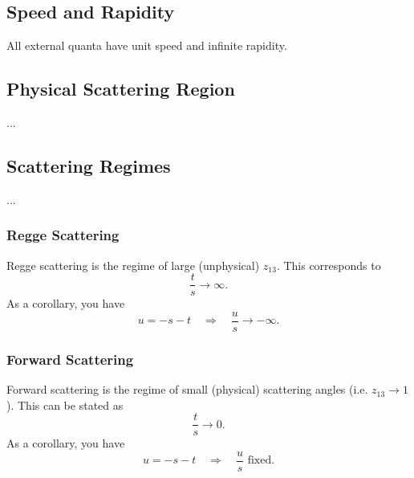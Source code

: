 \subsection{Speed and Rapidity}
All external quanta have unit speed and infinite rapidity.
\subsection{Physical Scattering Region}
...
\subsection{Scattering Regimes}
...
\subsubsection{Regge Scattering}
Regge scattering is the regime of large (unphysical) $z_{13}$. This corresponds to
\begin{equation}
	\frac{t}{s} \rightarrow \infty.
\end{equation}
As a corollary, you have
\begin{equation}
	u = - s - t \quad \Longrightarrow \quad \frac{u}{s} \rightarrow -\infty.
\end{equation}
\subsubsection{Forward Scattering}
Forward scattering is the regime of small (physical) scattering angles (i.e. $z_{13} \rightarrow 1$). This can be stated as
\begin{equation}
	\frac{t}{s} \rightarrow 0.
\end{equation}
As a corollary, you have
\begin{equation}
	u = - s - t \quad \Longrightarrow \quad \frac{u}{s} \text{ fixed}.
\end{equation}
